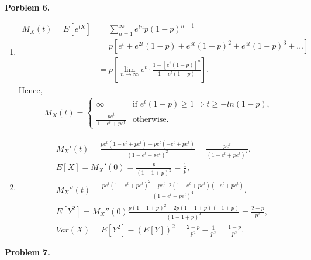 \documentclass{article}
\begin{document}
\textbf{Porblem 6.}
\begin{enumerate}[label={(\alph*)}]
    \item 
    \begin{align}
        M_X(t)=E[e^{tX}]&=\sum_{n=1}^{\infty}e^{tn}p(1-p)^{n-1}\\
        &=p\left[e^t+e^{2t}(1-p)+e^{3t}(1-p)^2+e^{4t}(1-p)^3+...\right]\\
        &=p\left[\lim_{n\rightarrow\infty}e^t\cdot\frac{1-[e^t(1-p)]^n}{1-e^t(1-p)}\right].
    \end{align}
    Hence,
    \begin{align}
        M_X(t)=
        \begin{cases}
            \infty &\text{if }e^t(1-p)\ge1\Rightarrow t\ge -ln(1-p),\\
            \frac{pe^t}{1-e^t+pe^t} &\text{otherwise}.
        \end{cases}
    \end{align}

    \item
    \begin{align}
        &M_X'(t)=\frac{pe^t(1-e^t+pe^t)-pe^t(-e^t+pe^t)}{(1-e^t+pe^t)^2}=\frac{pe^t}{(1-e^t+pe^t)^2},\\
        &E[X]=M_X'(0)=\frac{p}{(1-1+p)^2}=\frac{1}{p},\\
        &M_X''(t)=\frac{pe^t(1-e^t+pe^t)^2-pe^t\cdot2(1-e^t+pe^t)(-e^t+pe^t)}{(1-e^t+pe^t)^4},\\
        &E[Y^2]=M_X''(0)\frac{p(1-1+p)^2-2p(1-1+p)(-1+p)}{(1-1+p)^4}=\frac{2-p}{p^2},\\
        &Var(X)=E[Y^2]-(E[Y])^2=\frac{2-p}{p^2}-\frac{1}{p^2}=\frac{1-p}{p^2}.
    \end{align}
\end{enumerate}
\bigbreak

\textbf{Problem 7.}
\end{document}

